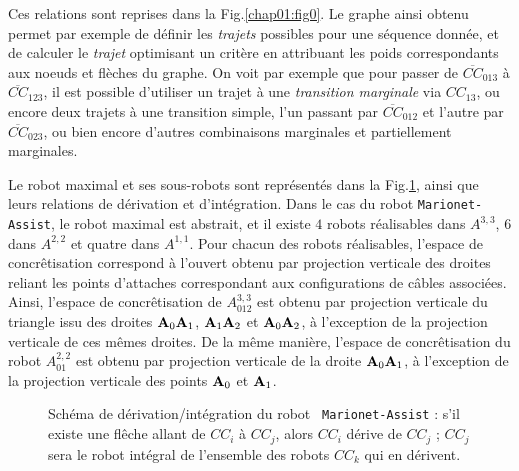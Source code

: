 Ces relations sont reprises dans la Fig.\ref{chap01:fig0}. Le graphe ainsi 
obtenu permet par exemple de d\'efinir les {\it trajets} possibles pour une 
s\'equence donn\'ee, et de calculer le {\it trajet} optimisant un crit\`ere en 
attribuant les poids correspondants aux noeuds et fl\`eches du graphe. On voit 
par exemple que pour passer de $\overline{CC}_{013}$ \`a $\overline{CC}_{123}$, 
il est possible d'utiliser un trajet \`a une {\it transition marginale} via 
$CC_{13}$, ou encore deux trajets \`a une transition simple, l'un passant par 
$\overline{CC}_{012}$ et l'autre par $\overline{CC}_{023}$, ou bien encore 
d'autres combinaisons marginales et partiellement marginales.

Le robot maximal et ses sous-robots sont repr\'esent\'es dans la 
Fig.\ref{chap01:fig1}, ainsi que leurs relations de d\'erivation et 
d'int\'egration. Dans le cas du robot {\tt Mario\-net-As\-sist}, le robot 
maximal 
est abstrait, et il existe $4$ robots r\'ealisables dans $A^{3,3}$, $6$ dans 
$A^{2,2}$ et quatre dans $A^{1,1}$. Pour chacun des robots r\'ealisables, 
l'espace de concr\^etisation correspond \`a l'ouvert obtenu par projection 
verticale des droites reliant les points d'attaches correspondant aux 
configurations de c\^ables associ\'ees. Ainsi, l'espace de concr\^etisation de 
$A^{3,3}_{012}$ est obtenu par projection verticale du triangle issu des 
droites ${\bf A}_0{\bf A}_1$, ${\bf A}_1{\bf A}_2$ et ${\bf A}_0{\bf A}_2$, \`a 
l'exception de la projection verticale de ces m\^emes droites. De la m\^eme 
mani\`ere, l'espace de concr\^etisation du robot $A^{2,2}_{01}$ est obtenu par 
projection verticale de la droite ${\bf A}_0{\bf A}_1$, \`a l'exception de la 
projection verticale des points ${\bf A}_0$ et ${\bf A}_1$.

\begin{figure}[htp]
  \centering
    \def\svgwidth{.65\linewidth}
  
    \caption{\footnotesize{Schéma de d\'erivation/int\'egration du robot {\tt 
Marionet-Assist} : s'il existe une fl\^eche allant de $CC_i$ \`a $CC_j$, 
alors $CC_i$ d\'erive de $CC_j$ ; $CC_j$ sera le robot int\'egral de l'ensemble 
des robots $CC_k$ qui en d\'erivent.}}
\label{chap01:fig1}
\end{figure}

